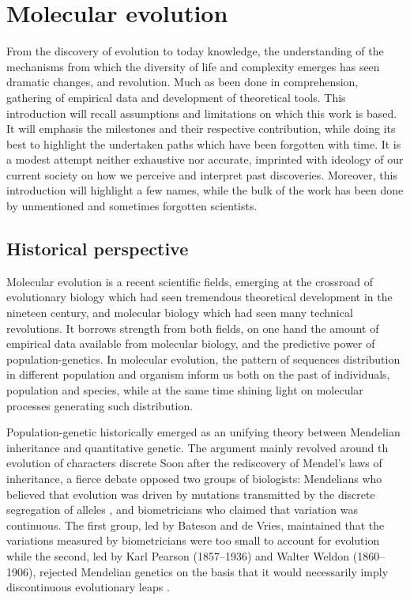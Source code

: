 \chapter{Molecular evolution}
\minitoc
\label{sec:intro}

From the discovery of evolution to today knowledge, the understanding of the mechanisms from which the diversity of life and complexity emerges has seen dramatic changes, and revolution.
Much as been done in comprehension, gathering of empirical data and development of theoretical tools.
This introduction will recall assumptions and limitations on which this work is based.
It will emphasis the milestones and their respective contribution, while doing its best to highlight the undertaken paths which have been forgotten with time.
It is a modest attempt neither exhaustive nor accurate, imprinted with ideology of our current society on how we perceive and interpret past discoveries.
Moreover, this introduction will highlight a few names, while the bulk of the work has been done by unmentioned and sometimes forgotten scientists.

\section{Historical perspective}

Molecular evolution is a recent scientific fields, emerging at the crossroad of evolutionary biology which had seen tremendous theoretical development in the nineteen century, and molecular biology which had seen many technical revolutions.
It borrows strength from both fields, on one hand the amount of empirical data available from molecular biology, and the predictive power of population-genetics.
In molecular evolution, the pattern of sequences distribution in different population and organism inform us both on the past of individuals, population and species, while at the same time shining light on molecular processes generating such distribution.

Population-genetic historically emerged as an unifying theory between 
Mendelian inheritance and quantitative genetic.
The argument mainly revolved around th evolution of characters  discrete 
Soon after the rediscovery of Mendel's laws of inheritance, a fierce debate opposed two groups of biologists: Mendelians who believed that evolution was driven by mutations transmitted by the discrete segregation of alleles \citep{bowler2003evolution}, and biometricians who claimed that variation was continuous.
The first group, led by Bateson and de Vries, maintained that the variations measured by biometricians were too small to account for evolution while the second, led by Karl Pearson (1857--1936) and Walter Weldon (1860--1906), rejected Mendelian genetics on the basis that it would necessarily imply discontinuous evolutionary leaps \citep{provine2001origins}.

